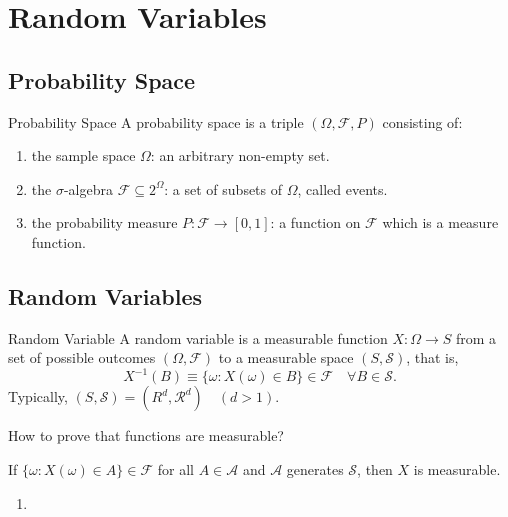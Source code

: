 \chapter{Random Variables}

\section{Probability Space}

\begin{definition}{Probability Space}{}
    A probability space is a triple $(\Omega,\mathcal{F},P)$ consisting of:
    \begin{enumerate}
        \item the sample space $\Omega$: an arbitrary non-empty set.
        \item the $\sigma$-algebra $\mathcal{F}\subseteq 2^{\Omega}$: a set of subsets of $\Omega$, called events.
        \item the probability measure $P:\mathcal{F} \rightarrow[0,1]$: a function on $\mathcal{F}$ which is a measure function.
    \end{enumerate}
\end{definition}

\section{Random Variables}

\begin{definition}{Random Variable}{}
    A random variable is a measurable function $X:\Omega\rightarrow S$ from a set of possible outcomes $(\Omega,\mathcal{F})$ to a measurable space $(S,\mathcal{S})$, that is,
    \begin{equation}
        X^{-1}(B)\equiv\{\omega:X(\omega)\in B\}\in\mathcal{F}\quad \forall B\in\mathcal{S}.
    \end{equation}
    Typically, $(S,\mathcal{S})=(R^d,\mathcal{R}^d)\quad(d>1)$.
\end{definition}

How to prove that functions are measurable?

\begin{theorem}
    If $\{\omega:X(\omega)\in A\}\in\mathcal{F}$ for all $A\in\mathcal{A}$ and $\mathcal{A}$ generates $\mathcal{S}$, then $X$ is measurable.
\end{theorem}

\begin{enumerate}
    \item 
\end{enumerate}

